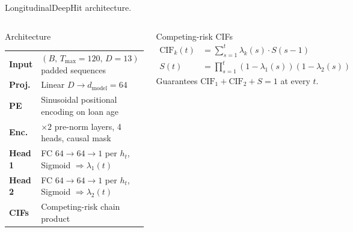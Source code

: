 \documentclass[10pt,aspectratio=169]{beamer}
\begin{document}
\begin{frame}{LongitudinalDeepHit architecture.}
    \begin{columns}[T,onlytextwidth]
        \begin{block}{Architecture}
        \small
        \begin{tabular}{@{}ll@{}}
            \textbf{Input}  & $(B,\, T_{\max}{=}120,\, D{=}13)$ padded sequences \\
            \textbf{Proj.}  & Linear $D \to d_{\text{model}}{=}64$ \\
            \textbf{PE}     & Sinusoidal positional encoding on loan age \\
            \textbf{Enc.}   & $\times 2$ pre-norm layers, 4 heads, causal mask \\
            \textbf{Head 1} & FC $64\!\to\!64\!\to\!1$ per $h_t$, Sigmoid $\Rightarrow \lambda_1(t)$ \\
            \textbf{Head 2} & FC $64\!\to\!64\!\to\!1$ per $h_t$, Sigmoid $\Rightarrow \lambda_2(t)$ \\
            \textbf{CIFs}   & Competing-risk chain product \\
        \end{tabular}
        \end{block}

        \vspace{0.1em}
        \begin{block}{Competing-risk CIFs}
        \footnotesize
        \vspace{-0.9em}
        \begin{align*}
            \text{CIF}_k(t) &= \textstyle\sum_{s=1}^{t} \lambda_k(s)\cdot S(s-1) \\[-3pt]
            S(t) &= \textstyle\prod_{s=1}^{t}(1-\lambda_1(s))(1-\lambda_2(s))
        \end{align*}
        \vspace{-0.9em}
        Guarantees $\text{CIF}_1 + \text{CIF}_2 + S = 1$ at every $t$.
        \end{block}


\end{columns}
\end{frame}
\end{document}
